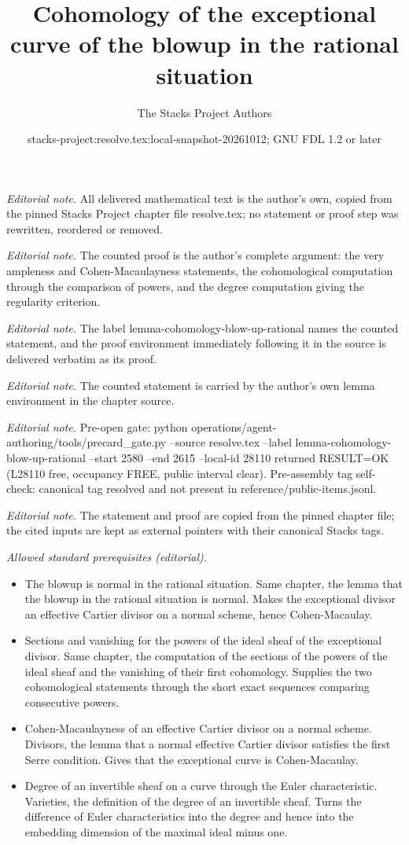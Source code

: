 \documentclass[10pt,a4paper]{amsart}
\title{Cohomology of the exceptional curve of the blowup in the rational situation}
\author{The Stacks Project Authors}
\date{stacks-project:resolve.tex:local-snapshot-20261012; GNU FDL 1.2 or later}
\theoremstyle{plain}
\theoremstyle{definition}
\theoremstyle{remark}
\numberwithin{equation}{subsection}
\begin{document}
\maketitle
\noindent\textit{Editorial note.} All delivered mathematical text is the author's own, copied from the pinned Stacks Project chapter file resolve.tex; no statement or proof step was rewritten, reordered or removed.\par\medskip
\noindent\textit{Editorial note.} The counted proof is the author's complete argument: the very ampleness and Cohen-Macaulayness statements, the cohomological computation through the comparison of powers, and the degree computation giving the regularity criterion.\par\medskip
\noindent\textit{Editorial note.} The label lemma-cohomology-blow-up-rational names the counted statement, and the proof environment immediately following it in the source is delivered verbatim as its proof.\par\medskip
\noindent\textit{Editorial note.} The counted statement is carried by the author's own lemma environment in the chapter source.\par\medskip
\noindent\textit{Editorial note.} Pre-open gate: python operations/agent-authoring/tools/precard\_gate.py --source resolve.tex --label lemma-cohomology-blow-up-rational --start 2580 --end 2615 --local-id 28110 returned RESULT=OK (L28110 free, occupancy FREE, public interval clear). Pre-assembly tag self-check: canonical tag resolved and not present in reference/public-items.jsonl.\par\medskip
\noindent\textit{Editorial note.} The statement and proof are copied from the pinned chapter file; the cited inputs are kept as external pointers with their canonical Stacks tags.\par\medskip
\noindent\textit{Allowed standard prerequisites (editorial).}\begin{itemize}
\item The blowup is normal in the rational situation. Same chapter, the lemma that the blowup in the rational situation is normal. Makes the exceptional divisor an effective Cartier divisor on a normal scheme, hence Cohen-Macaulay.
\item Sections and vanishing for the powers of the ideal sheaf of the exceptional divisor. Same chapter, the computation of the sections of the powers of the ideal sheaf and the vanishing of their first cohomology. Supplies the two cohomological statements through the short exact sequences comparing consecutive powers.
\item Cohen-Macaulayness of an effective Cartier divisor on a normal scheme. Divisors, the lemma that a normal effective Cartier divisor satisfies the first Serre condition. Gives that the exceptional curve is Cohen-Macaulay.
\item Degree of an invertible sheaf on a curve through the Euler characteristic. Varieties, the definition of the degree of an invertible sheaf. Turns the difference of Euler characteristics into the degree and hence into the embedding dimension of the maximal ideal minus one.
\end{itemize}\medskip
\end{document}
